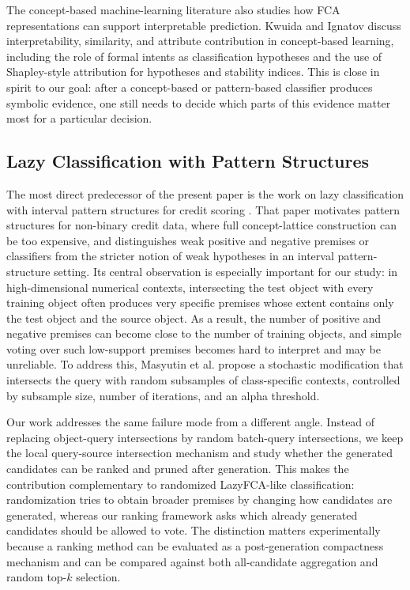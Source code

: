 \documentclass[11pt]{article}
\begin{document}
The concept-based machine-learning literature also studies how FCA
representations can support interpretable prediction. Kwuida and Ignatov
\cite{kwuida2020interpretability} discuss interpretability, similarity, and
attribute contribution in concept-based learning, including the role of
formal intents as classification hypotheses and the use of Shapley-style
attribution for hypotheses and stability indices. This is close in spirit to
our goal: after a concept-based or pattern-based classifier produces symbolic
evidence, one still needs to decide which parts of this evidence matter most
for a particular decision.

\subsection{Lazy Classification with Pattern Structures}

The most direct predecessor of the present paper is the work on lazy
classification with interval pattern structures for credit scoring
\cite{masyutin2015lazy}. That paper motivates pattern structures for
non-binary credit data, where full concept-lattice construction can be too
expensive, and distinguishes weak positive and negative premises or classifiers
from the stricter notion of weak hypotheses in an interval pattern-structure
setting. Its central observation is especially important for our study: in
high-dimensional numerical contexts, intersecting the test object with every
training object often produces very specific premises whose extent contains
only the test object and the source object. As a result, the number of
positive and negative premises can become close to the number of training
objects, and simple voting over such low-support premises becomes hard to
interpret and may be unreliable. To address this, Masyutin et al. propose a
stochastic modification that intersects the query with random subsamples of
class-specific contexts, controlled by subsample size, number of iterations,
and an alpha threshold.

Our work addresses the same failure mode from a different angle. Instead of
replacing object-query intersections by random batch-query intersections, we
keep the local query-source intersection mechanism and study whether the
generated candidates can be ranked and pruned after generation. This makes the
contribution complementary to randomized LazyFCA-like classification:
randomization tries to obtain broader premises by changing how candidates are
generated, whereas our ranking framework asks which already generated
candidates should be allowed to vote. The distinction matters experimentally
because a ranking method can be evaluated as a post-generation compactness
mechanism and can be compared against both all-candidate aggregation and
random top-$k$ selection.
\end{document}
